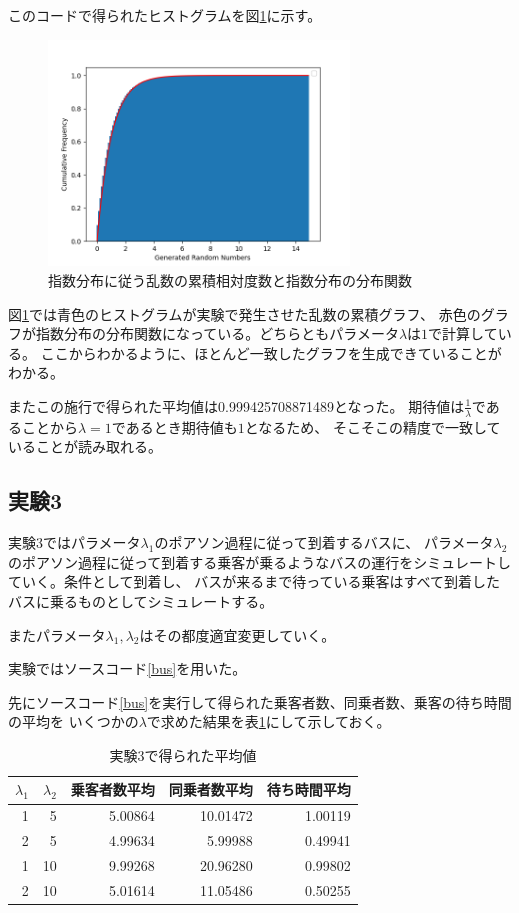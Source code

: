 \documentclass[a4paper,11pt,dvipdfmx]{jsarticle}
\begin{document}
このコードで得られたヒストグラムを図\ref{expohist}に示す。
\begin{figure}[h]
\centering
\includegraphics[width=80mm]{Exporand.png}
\caption{指数分布に従う乱数の累積相対度数と指数分布の分布関数}
\label{expohist}
\end{figure}

図\ref{expohist}では青色のヒストグラムが実験で発生させた乱数の累積グラフ、
赤色のグラフが指数分布の分布関数になっている。どちらともパラメータ$\lambda$は$1$で計算している。
ここからわかるように、ほとんど一致したグラフを生成できていることがわかる。

またこの施行で得られた平均値は0.999425708871489となった。
期待値は$\frac{1}{\lambda}$であることから$\lambda=1$であるとき期待値も$1$となるため、
そこそこの精度で一致していることが読み取れる。

\subsection{実験3}
実験3ではパラメータ$\lambda_1$のポアソン過程に従って到着するバスに、
パラメータ$\lambda_2$のポアソン過程に従って到着する乗客が乗るようなバスの運行をシミュレートしていく。条件として到着し、
バスが来るまで待っている乗客はすべて到着したバスに乗るものとしてシミュレートする。

またパラメータ$\lambda_1,\lambda_2$はその都度適宜変更していく。

実験ではソースコード\ref{bus}を用いた。


先にソースコード\ref{bus}を実行して得られた乗客者数、同乗者数、乗客の待ち時間の平均を
いくつかの$\lambda$で求めた結果を表\ref{result}にして示しておく。
\begin{table}[h]
    \centering
    \caption{実験3で得られた平均値}
    \begin{tabular}{|r|r|r|r|r|} \hline
        $\lambda_1$ & $\lambda_2$ & 乗客者数平均 & 同乗者数平均 & 待ち時間平均 \\ \hline
        1 & 5  & 5.00864 & 10.01472 & 1.00119 \\ \hline
        2 & 5  & 4.99634 & 5.99988  & 0.49941 \\ \hline
        1 & 10 & 9.99268 & 20.96280 & 0.99802 \\ \hline
        2 & 10 & 5.01614 & 11.05486 & 0.50255 \\ \hline
    \end{tabular}
    \label{result}
\end{table}
\end{document}

